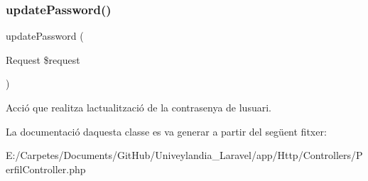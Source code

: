 \subsubsection{\texorpdfstring{update\+Password()}{updatePassword()}}
{\footnotesize\ttfamily update\+Password (\begin{DoxyParamCaption}\item[{Request}]{\$request }\end{DoxyParamCaption})}

Acció que realitza l\textquotesingle{}actualització de la contrasenya de l\textquotesingle{}usuari. 

La documentació d\textquotesingle{}aquesta classe es va generar a partir del següent fitxer\+:\begin{DoxyCompactItemize}
\item 
E\+:/\+Carpetes/\+Documents/\+Git\+Hub/\+Univeylandia\+\_\+\+Laravel/app/\+Http/\+Controllers/Perfil\+Controller.\+php\end{DoxyCompactItemize}
